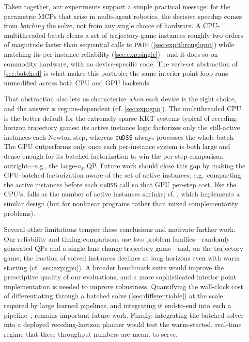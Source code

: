 \documentclass[conference]{IEEEtran}
\begin{document}
Taken together, our experiments support a simple practical message: for the parametric MCPs
that arise in multi-agent robotics, the decisive speedup comes from \emph{batching} the solve,
not from any single choice of hardware. A CPU-multithreaded batch clears a set of trajectory-game
instances roughly two orders of magnitude faster than sequential calls to \texttt{PATH}
(\cref{sec:exp:throughput}) while matching its per-instance reliability
(\cref{sec:exp:single})---and it does so on commodity hardware, with no device-specific code.
The verb-set abstraction of \cref{sec:batched} is what makes this portable: the same interior
point loop runs unmodified across both CPU and GPU backends.

That abstraction also lets us characterize \emph{when} each device is the right choice, and the
answer is regime-dependent (cf. \cref{sec:exp:gpu}). The multithreaded CPU is the better default for
the extremely sparse KKT systems typical of receding-horizon trajectory games: its
active instance logic factorizes only the still-active instances each Newton step, whereas \texttt{cuDSS}
always processes the whole batch. The GPU outperforms only once each per-instance system is both
large and dense enough for its batched factorization to win the per-step
comparison outright---e.g., the
large-$n_x$ QP. Future work should close this gap by
making the GPU-batched factorization aware of the set of active instances, e.g.\ compacting the
active instances before each \texttt{cuDSS} call so that GPU per-step cost, like the CPU's, falls
as the number of active instances shrinks; cf. \cite{viljoen2026scaling}, which
implements a similar design (but for nonlinear programs rather than mixed
complementarity problems).

Several other limitations temper these conclusions and motivate further work. Our reliability and timing
comparisons use two problem families---randomly generated QPs and a single lane-change trajectory
game---and, on the trajectory game, the fraction of solved instances declines at long horizons even with warm
starting (cf. \cref{sec:exp:gpu}). A broader benchmark suite would improve the
prescriptive quality of our evaluations, and a more
sophisticated interior point implementation is needed to improve robustness. Quantifying the
wall-clock cost of differentiating through a batched solve (\cref{sec:differentiable}) at the
scale required by large learned pipelines, and integrating it end-to-end into such a
pipeline~\cite{amos2017optnet}, remains important future work. Finally,
integrating the batched solver into a deployed receding-horizon planner would test the
warm-started, real-time regime that these throughput numbers are meant to serve.



\end{document}
